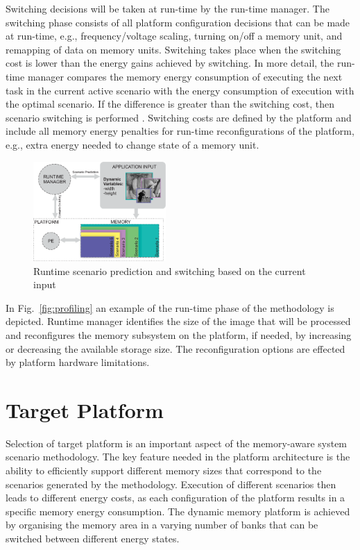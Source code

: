 \documentclass[a4paper,conference]{IEEEtran}
\begin{document}
Switching decisions will be taken at run-time by the run-time manager. The switching phase consists of all platform configuration decisions that can be made at run-time, e.g., frequency/voltage scaling, turning on/off a memory unit, and remapping of data on memory units. Switching takes place when the switching cost is lower than the energy gains achieved by switching. In more detail, the run-time manager compares the memory energy consumption of executing the next task in the current active scenario with the energy consumption of execution with the optimal scenario. If the difference is greater than the switching cost, then scenario switching is performed \cite{tcm}. Switching costs are defined by the platform and include all memory energy penalties for run-time reconfigurations of the platform, e.g., extra energy needed to change state of a memory unit.

\begin{figure}[!t]
\centering
\includegraphics[width=0.45\textwidth]{Images/switching.eps}
\caption{Runtime scenario prediction and switching based on the current input}
\label{fig:runtime}
\end{figure}

In Fig.~\ref{fig:profiling} an example of the run-time phase of the methodology is depicted. Runtime manager identifies the size of the image that will be processed and reconfigures the memory subsystem on the platform, if needed, by increasing or decreasing the available storage size. The reconfiguration options are effected by platform hardware limitations.

\section{Target Platform}
\label{sec:platform}

Selection of target platform is an important aspect of the memory-aware system scenario methodology. The key feature needed in the platform architecture is the ability to efficiently support different memory sizes that correspond to the scenarios generated by the methodology. Execution of different scenarios then leads to different energy costs, as each configuration of the platform results in a specific memory energy consumption. The dynamic memory platform is achieved by organising the memory area in a varying number of banks that can be switched between different energy states. 
\end{document}
